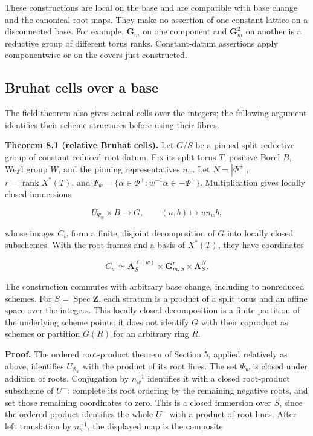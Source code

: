 \documentclass[11pt,a4paper,openany]{report}
\begin{document}
These constructions are local on the base and are compatible with base change and the canonical root maps. They make no assertion of one constant lattice on a disconnected base. For example, \(\mathbf G_m\) on one component and \(\mathbf G_m^2\) on another is a reductive group of different torus ranks. Constant-datum assertions apply componentwise or on the covers just constructed.

\subsection{Bruhat cells over a base}\label{AG-RG-04-bruhat-cells-over-a-base}

The field theorem also gives actual cells over the integers; the following argument identifies their scheme structures before using their fibres.

\textbf{Theorem 8.1 (relative Bruhat cells).} Let \(G/S\) be a pinned split reductive group of constant reduced root datum. Fix its split torus \(T\), positive Borel \(B\), Weyl group \(W\), and the pinning representatives \(n_w\). Let \(N=|\Phi^+|\), \(r=\operatorname{rank}X^*(T)\), and \(\Psi_w=\{\alpha\in\Phi^+:w^{-1}\alpha\in-\Phi^+\}\). Multiplication gives locally closed immersions

\[
U_{\Psi_w}\times B\longrightarrow G,\qquad (u,b)\longmapsto un_wb,
\]

whose images \(C_w\) form a finite, disjoint decomposition of \(G\) into locally closed subschemes. With the root frames and a basis of \(X^*(T)\), they have coordinates

\[
C_w\simeq\mathbf A_S^{\ell(w)}\times\mathbf G_{m,S}^{r}\times\mathbf A_S^N.
\]

The construction commutes with arbitrary base change, including to nonreduced schemes. For \(S=\operatorname{Spec}\mathbf Z\), each stratum is a product of a split torus and an affine space over the integers. This locally closed decomposition is a finite partition of the underlying scheme points; it does not identify \(G\) with their coproduct as schemes or partition \(G(R)\) for an arbitrary ring \(R\).

\textbf{Proof.} The ordered root-product theorem of Section 5, applied relatively as above, identifies \(U_{\Psi_w}\) with the product of its root lines. The set \(\Psi_w\) is closed under addition of roots. Conjugation by \(n_w^{-1}\) identifies it with a closed root-product subscheme of \(U^-\): complete its root ordering by the remaining negative roots, and set those remaining coordinates to zero. This is a closed immersion over \(S\), since the ordered product identifies the whole \(U^-\) with a product of root lines. After left translation by \(n_w^{-1}\), the displayed map is the composite
\end{document}
